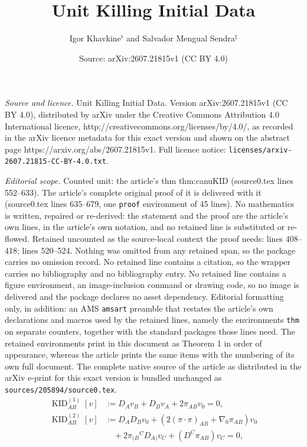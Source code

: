 \documentclass[10pt,a4paper]{amsart}
\title{Unit Killing Initial Data}
\author{Igor Khavkine$^\flat$ {} and Salvador Mengual Sendra$^{\sharp}$}
\date{Source: arXiv:2607.21815v1 (CC BY 4.0)}
\newcommand{\KIDi}{\operatorname{KID}^{(1)}}
\newcommand{\KIDii}{\operatorname{KID}^{(2)}}
\begin{document}
\maketitle

\noindent\emph{Source and licence.} Unit Killing Initial Data. Version arXiv:2607.21815v1 (CC BY 4.0), distributed by arXiv under the Creative Commons Attribution 4.0 International licence, http://creativecommons.org/licenses/by/4.0/, as recorded in the arXiv licence metadata for this exact version and shown on the abstract page https://arxiv.org/abs/2607.21815v1. Full licence notice: \texttt{licenses/arxiv-2607.21815-CC-BY-4.0.txt}.\par\smallskip

\noindent\textit{Editorial scope.} Counted unit: the article's thm thm:canuKID (source0.tex lines 552--633). The article's complete original proof of it is delivered with it (source0.tex lines 635--679, one \texttt{proof} environment of 45 lines). No mathematics is written, repaired or re-derived: the statement and the proof are the article's own lines, in the article's own notation, and no retained line is substituted or re-flowed.  Retained uncounted as the source-local context the proof needs: lines 408--418; lines 520--524.  Nothing was omitted from any retained span, so the package carries no omission record.  No retained line contains a citation, so the wrapper carries no bibliography and no bibliography entry.  No retained line contains a figure environment, an image-inclusion command or drawing code, so no image is delivered and the package declares no asset dependency.  Editorial formatting only, in addition: an AMS \texttt{amsart} preamble that restates the article's own declarations and macros used by the retained lines, namely the environments \texttt{thm} on separate counters, together with the standard packages those lines need.  The retained environments print in this document as Theorem 1 in order of appearance, whereas the article prints the same items with the numbering of its own full document.  The complete native source of the article as distributed in the arXiv e-print for this exact version is bundled unchanged as \texttt{sources/205894/source0.tex}.
\begin{equation} \label{eq:KID}
\begin{aligned}
	\KIDi_{AB}[v] &:= D_A v_B + D_B v_A + 2\pi_{AB} v_0 = 0 ,
	\\
	\KIDii_{AB}[v] &:= D_{A} D_{B} v_{0}
	+ (2(\pi\cdot\pi)_{A B} + \nabla_0 \pi_{AB}) v_0 \\
	& \quad {}
	+ 2 \pi_{(B}{}^{C} D_{A)} v_C
	+ (D^{C}{\pi_{A B}}) v_{C} = 0 ,
\end{aligned}
\end{equation}
\end{document}
